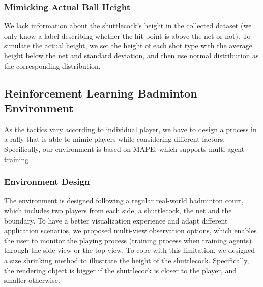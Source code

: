 \documentclass[letterpaper]{article}
\begin{document}
\subsubsection{Mimicking Actual Ball Height}
We lack information about the shuttlecock's height in the collected dataset (we only know a label describing whether the hit point is above the net or not).
To simulate the actual height, we set the height of each shot type with the average height below the net and standard deviation, and then use normal distribution as the corresponding distribution.

\subsection{Reinforcement Learning Badminton Environment}
As the tactics vary according to individual player, we have to design a process in a rally that is able to mimic players while considering different factors.
Specifically, our environment is based on MAPE, which supports multi-agent training.

\subsubsection{Environment Design}
The environment is designed following a regular real-world badminton court, which includes two players from each side, a shuttlecock, the net and the boundary.
To have a better visualization experience and adapt different application scenarios, we proposed multi-view observation options, which enables the user to monitor the playing process (training process when training agents) through the side view or the top view.
To cope with this limitation, we designed a size shrinking method to illustrate the height of the shuttlecock.
Specifically, the rendering object is bigger if the shuttlecock is closer to the player, and smaller otherwise.
\end{document}
